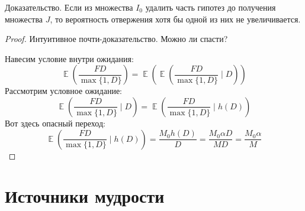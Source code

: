 \documentclass[12pt]{article}
\DeclareMathOperator{\E}{\mathbb{E}}
\begin{document}
Доказательство. Если из множества $I_0$ удалить часть гипотез до получения множества $J$, то вероятность отвержения хотя бы одной из них не увеличивается.


\begin{proof}
Интуитивное почти-доказательство. Можно ли спасти?

Навесим условие внутри ожидания:
\[
\E\left( \frac{FD}{\max\{1, D\}} \right) = \E\left(\E\left( \frac{FD}{\max\{1, D\}} \mid D \right) \right)
\]
Рассмотрим условное ожидание:
\[
    \E\left( \frac{FD}{\max\{1, D\}} \mid D \right) = \E\left( \frac{FD}{\max\{1, D\}} \mid h(D) \right)
\]
Вот здесь опасный переход:
\[
    \E\left( \frac{FD}{\max\{1, D\}} \mid h(D) \right) = \frac{M_0 h(D)}{D} = \frac{M_0 \alpha D}{MD} = \frac{M_0 \alpha}{M}
\]
\end{proof}



\section*{Источники мудрости}
\end{document}
